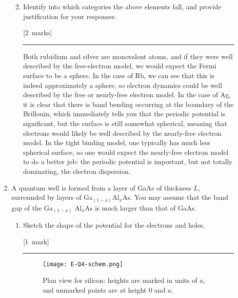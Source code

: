 \documentclass[12pt,a4paper]{article}
\newcommand{\sepline}[0]{\par \hfil\rule{10cm}{0.4pt} \vspace*{\parskip}\hfil}
\begin{document}
\begin{enumerate}
\begin{enumerate}
\begin{enumerate}
\begin{answer}
						\end{answer}

						\item Identify into which categories the above elements fall, and provide justification for your responses.

						\hfill{[2~marks]}

						\begin{answer}

							\sepline

							Both rubidium and silver are monovalent atoms, and if they were well described by the free-electron model, we would expect the Fermi surface to be a sphere. In the case of Rb, we can see that this is indeed approximately a sphere, so electron dynamics could be well described by the free or nearly-free electron model. In the case of Ag, it is clear that there is band bending occurring at the boundary of the Brillouin, which immediately tells you that the periodic potential is significant, but the surface is still somewhat spherical, meaning that electrons would likely be well described by the nearly-free electron model. In the tight binding model, one typically has much less spherical surface, so one would expect the nearly-free electron model to do a better job: the periodic potential is important, but not totally dominating, the electron dispersion.

						\end{answer}

					\end{enumerate}

					\item A quantum well is formed from a layer of GaAs of thickness $L$, surrounded by layers of Ga$_{(1-x)}$Al$_x$As. You may assume that the band gap of the Ga$_{(1-x)}$ Al$_x$As is much larger than that of GaAs.

					\begin{enumerate}
						\item Sketch the shape of the potential for the electrons and holes.

						\hfill{[1~mark]}

						\begin{answer}

							\sepline

							\begin{figure}[h]
								\centering
								\texttt{[image: E-Q4-schem.png]}
								\caption{Plan view for silicon: heights are marked in units of $a$, and unmarked points are at height $0$ and $a$.}
							\end{figure}


\end{answer}
\end{enumerate}
\end{enumerate}
\end{enumerate}
\end{document}
